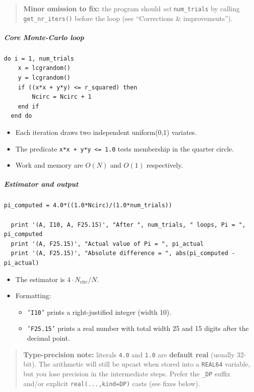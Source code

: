 \begin{quote}
\textbf{Minor omission to fix:} the program should \textit{set} \texttt{num\_trials} by calling \texttt{get\_nr\_iters()} before the loop (see ``Corrections \& improvements'').
\end{quote}

\subparagraph{Core Monte-Carlo loop}

\begin{verbatim}
do i = 1, num_trials
    x = lcgrandom()
    y = lcgrandom()
    if ((x*x + y*y) <= r_squared) then
        Ncirc = Ncirc + 1
    end if
  end do
\end{verbatim}

\begin{itemize}
\item Each iteration draws two independent uniform(0,1) variates.
\item The predicate \texttt{x*x + y*y \textless = 1.0} tests membership in the quarter circle.
\item Work and memory are \textbf{$O(N)$} and \textbf{$O(1)$} respectively.
\end{itemize}

\subparagraph{Estimator and output}

\begin{verbatim}
pi_computed = 4.0*((1.0*Ncirc)/(1.0*num_trials))

  print '(A, I10, A, F25.15)', "After ", num_trials, " loops, Pi = ", pi_computed
  print '(A, F25.15)', "Actual value of Pi = ", pi_actual
  print '(A, F25.15)', "Absolute difference = ", abs(pi_computed - pi_actual)
\end{verbatim}

\begin{itemize}
\item The estimator is $4\cdot N_{\text{circ}}/N$.
\item Formatting:

\begin{itemize}
\item \texttt{'I10'} prints a right-justified integer (width 10).
\item \texttt{'F25.15'} prints a real number with total width 25 and 15 digits after the decimal point.
\end{itemize}
\end{itemize}

\begin{quote}
\textbf{Type-precision note:} literals \texttt{4.0} and \texttt{1.0} are \textbf{default real} (usually 32-bit). The arithmetic will still be upcast when stored into a \texttt{REAL64} variable, but you lose precision in the intermediate steps. Prefer the \texttt{\_DP} suffix and/or explicit \texttt{real(...,kind=DP)} casts (see fixes below).
\end{quote}


